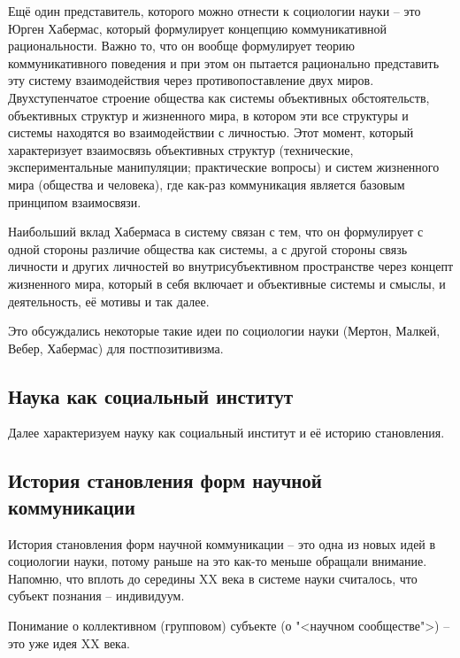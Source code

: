\documentclass[main.tex]{subfiles}
\begin{document}
Ещё один представитель, которого можно отнести к социологии науки -- это Юрген Хабермас, который формулирует концепцию коммуникативной рациональности.
Важно то, что он вообще формулирует теорию коммуникативного поведения и при этом он пытается рационально представить эту систему взаимодействия через противопоставление двух миров.
Двухступенчатое строение общества как системы объективных обстоятельств, объективных структур и жизненного мира, в котором эти все структуры и системы находятся во взаимодействии с личностью.
Этот момент, который характеризует взаимосвязь объективных структур (технические, экспериментальные манипуляции; практические вопросы) и систем жизненного мира (общества и человека), где как-раз коммуникация является базовым принципом взаимосвязи.

Наибольший вклад Хабермаса в систему связан с тем, что он формулирует с одной стороны различие общества как системы, а с другой стороны связь личности и других личностей во внутрисубъективном пространстве через концепт жизненного мира, который в себя включает и объективные системы и смыслы, и деятельность, её мотивы и так далее.

Это обсуждались некоторые такие идеи по социологии науки (Мертон, Малкей, Вебер, Хабермас) для постпозитивизма. 

\subsection{Наука как социальный институт}


Далее характеризуем науку как социальный институт и её историю становления.

\subsection{История становления форм научной коммуникации}


История становления форм научной коммуникации -- это одна из новых идей в социологии науки, потому раньше на это как-то меньше обращали внимание.
Напомню, что вплоть до середины XX века в системе науки считалось, что субъект познания -- индивидуум.

Понимание о коллективном (групповом) субъекте (о "<научном сообществе">) -- это уже идея XX века.

\end{document}
